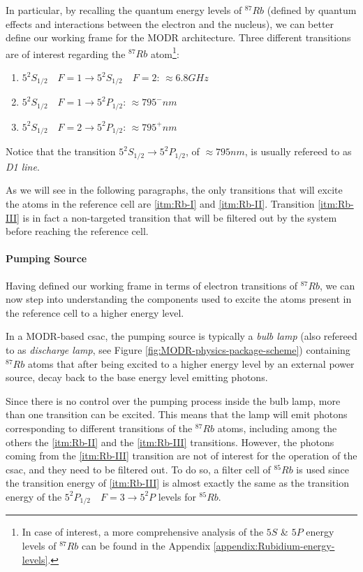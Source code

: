 In particular, by recalling the quantum energy levels of $^{87}Rb$ (defined by quantum effects and interactions between the electron and the nucleus), we can better define our working frame for the MODR architecture.
Three different transitions are of interest regarding the $^{87}Rb$ atom\footnote{In case of interest, a more comprehensive analysis of the $5S$ \& $5P$ energy levels of $^{87}Rb$ can be found in the Appendix \ref{appendix:Rubidium-energy-levels}.}:

\begin{enumerate}[label = Rb.\Roman*, ref = Rb.\Roman*, leftmargin = *]
    \item \label{itm:Rb-I} $5^2S_{1/2} \quad F=1 \rightarrow 5^2S_{1/2} \quad F=2$: $\approx 6.8GHz$
    \item \label{itm:Rb-II} $5^2S_{1/2} \quad F=1 \rightarrow 5^2P_{1/2}$: $\approx 795^{-}nm$
    \item \label{itm:Rb-III} $5^2S_{1/2} \quad F=2 \rightarrow 5^2P_{1/2}$: $\approx 795^{+}nm$
\end{enumerate}

Notice that the transition $5^2S_{1/2} \rightarrow 5^2P_{1/2}$, of $\approx 795nm$, is usually refereed to as \textit{D1 line}.

As we will see in the following paragraphs, the only transitions that will excite the atoms in the reference cell are \ref{itm:Rb-I} and \ref{itm:Rb-II}.
Transition \ref{itm:Rb-III} is in fact a non-targeted transition that will be filtered out by the system before reaching the reference cell.


\paragraph{Pumping Source}

Having defined our working frame in terms of electron transitions of $^{87}Rb$, we can now step into understanding the components used to excite the atoms present in the reference cell to a higher energy level.

In a MODR-based \acrshort{csac}, the pumping source is typically a \textit{bulb lamp} (also refereed to as \textit{discharge lamp}, see Figure \ref{fig:MODR-physics-package-scheme}) containing $^{87}Rb$ atoms that after being excited to a higher energy level by an external power source, decay back to the base energy level emitting photons.

Since there is no control over the pumping process inside the bulb lamp, more than one transition can be excited.
This means that the lamp will emit photons corresponding to different transitions of the $^{87}Rb$ atoms, including among the others the \ref{itm:Rb-II} and the \ref{itm:Rb-III} transitions.
However, the photons coming from the \ref{itm:Rb-III} transition are not of interest for the operation of the \acrshort{csac}, and they need to be filtered out.
To do so, a filter cell of $^{85}Rb$ is used since the transition energy of \ref{itm:Rb-III} is almost exactly the same as the transition energy of the $5^2P_{1/2} \quad F=3 \rightarrow 5^2P$ levels for $^{85}Rb$.

